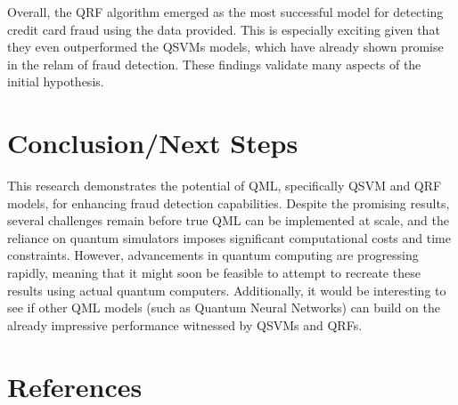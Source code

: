\documentclass[11pt, oneside]{article}   	%
\begin{document}
Overall, the QRF algorithm emerged as the most successful model for detecting credit card fraud using the data provided. This is especially exciting given that they even outperformed the QSVMs models, which have already shown promise in the relam of fraud detection. These findings validate many aspects of the initial hypothesis.




\section{Conclusion/Next Steps}

This research demonstrates the potential of QML, specifically QSVM and QRF models, for enhancing fraud detection capabilities. Despite the promising results, several challenges remain before true QML can be implemented at scale, and the reliance on quantum simulators imposes significant computational costs and time constraints. However, advancements in quantum computing are progressing rapidly, meaning that it might soon be feasible to attempt to recreate these results using actual quantum computers. Additionally, it would be interesting to see if other QML models (such as Quantum Neural Networks) can build on the already impressive performance witnessed by QSVMs and QRFs.

\newpage

\section{References}
\end{document}
